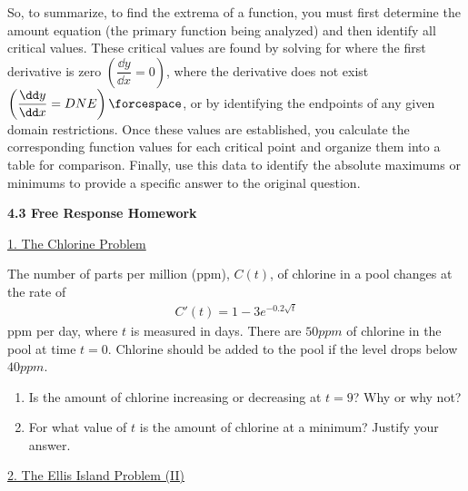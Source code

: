 So, to summarize, to find the extrema of a function, you must first determine the amount equation (the primary function being analyzed) and then identify all critical values. These critical values are found by solving for where the first derivative is zero $\left(\dfrac{\dd y}{\dd x} = 0\right)$, where the derivative does not exist $\left(\dfrac{\dd y}{\dd x} = DNE\right)\forcespace$, or by identifying the endpoints of any given domain restrictions. Once these values are established, you calculate the corresponding function values for each critical point and organize them into a table for comparison. Finally, use this data to identify the absolute maximums or minimums to provide a specific answer to the original question. \par

\newpage

\textbf{\large{4.3 Free Response Homework}} \par

\begin{center}
    \underline{1. The Chlorine Problem}
\end{center}

The number of parts per million (ppm), $C(t)$, of chlorine in a pool changes at the rate of \begin{align*}
    C'(t) = 1 - 3e^{-0.2\sqrt{t}}
\end{align*}
ppm per day, where $t$ is measured in days. There are $50 \si{ppm}$ of chlorine in the pool at time $t = 0$. Chlorine should be added to the pool if the level drops below $40 \si{ppm}$. \\
\begin{enumerate}[label=\hspace{11pt}(\alph*), align=left, leftmargin=*, labelsep=0.25em]
    \item Is the amount of chlorine increasing or decreasing at $t = 9$? Why or why not?
    \item For what value of $t$ is the amount of chlorine at a minimum? Justify your answer.
\end{enumerate} \vspace{11pt}

\begin{center}
    \underline{2. The Ellis Island Problem (II)}
\end{center}


